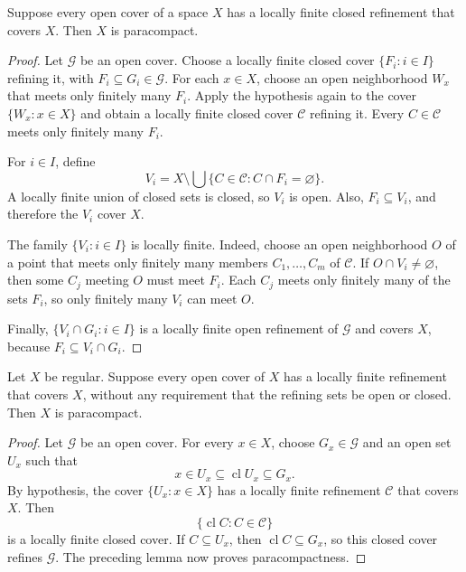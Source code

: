 \begin{lem}
Suppose every open cover of a space $X$ has a locally finite closed refinement
that covers $X$. Then $X$ is paracompact.
\end{lem}

\begin{proof}
Let $\mathcal{G}$ be an open cover. Choose a locally finite closed cover
$\{F_i:i\in I\}$ refining it, with $F_i\subseteq G_i\in\mathcal{G}$.
For each $x\in X$, choose an open neighborhood $W_x$ that meets only finitely
many $F_i$. Apply the hypothesis again to the cover $\{W_x:x\in X\}$ and
obtain a locally finite closed cover $\mathcal{C}$ refining it. Every
$C\in\mathcal{C}$ meets only finitely many $F_i$.

For $i\in I$, define
\[
V_i
=
X\setminus
\bigcup\{C\in\mathcal{C}:C\cap F_i=\varnothing\}.
\]
A locally finite union of closed sets is closed, so $V_i$ is open. Also,
$F_i\subseteq V_i$, and therefore the $V_i$ cover $X$.

The family $\{V_i:i\in I\}$ is locally finite. Indeed, choose an open
neighborhood $O$ of a point that meets only finitely many members
$C_1,\ldots,C_m$ of $\mathcal{C}$. If $O\cap V_i\neq\varnothing$, then some
$C_j$ meeting $O$ must meet $F_i$. Each $C_j$ meets only finitely many of the
sets $F_i$, so only finitely many $V_i$ can meet $O$.

Finally, $\{V_i\cap G_i:i\in I\}$ is a locally finite open refinement of
$\mathcal{G}$ and covers $X$, because $F_i\subseteq V_i\cap G_i$.
\end{proof}

\begin{lem}
Let $X$ be regular. Suppose every open cover of $X$ has a locally finite
refinement that covers $X$, without any requirement that the refining sets be
open or closed. Then $X$ is paracompact.
\end{lem}

\begin{proof}
Let $\mathcal{G}$ be an open cover. For every $x\in X$, choose
$G_x\in\mathcal{G}$ and an open set $U_x$ such that
\[
x\in U_x\subseteq\operatorname{cl}U_x\subseteq G_x.
\]
By hypothesis, the cover $\{U_x:x\in X\}$ has a locally finite refinement
$\mathcal{C}$ that covers $X$. Then
\[
\{\operatorname{cl}C:C\in\mathcal{C}\}
\]
is a locally finite closed cover. If $C\subseteq U_x$, then
$\operatorname{cl}C\subseteq G_x$, so this closed cover refines
$\mathcal{G}$. The preceding lemma now proves paracompactness.
\end{proof}

